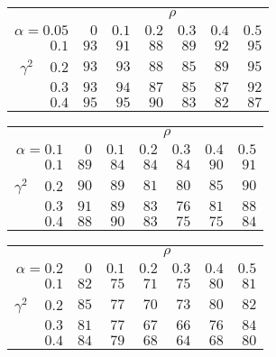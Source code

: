 \begin{tabular}{r|rrrrrr}
\hline\hline
 &\multicolumn{6}{c}{$\rho$} \\ 
 $\alpha = 0.05$ & $0$ & $0.1$ & $0.2$ & $0.3$ & $0.4$ & $0.5$ \\ 
 \hline$0.1$ & $93$ & $91$ & $88$ & $89$ & $92$ & $95$\\ 
$\gamma^2\;\;\;$ $0.2$ & $93$ & $93$ & $88$ & $85$ & $89$ & $95$\\ 
$0.3$ & $93$ & $94$ & $87$ & $85$ & $87$ & $92$\\ 
$0.4$ & $95$ & $95$ & $90$ & $83$ & $82$ & $87$\\ 
 \hline 
 \end{tabular}
 
 \vspace{2em} 
 
\begin{tabular}{r|rrrrrr}
\hline\hline
 &\multicolumn{6}{c}{$\rho$} \\ 
 $\alpha = 0.1$ & $0$ & $0.1$ & $0.2$ & $0.3$ & $0.4$ & $0.5$ \\ 
 \hline$0.1$ & $89$ & $84$ & $84$ & $84$ & $90$ & $91$\\ 
$\gamma^2\;\;\;$ $0.2$ & $90$ & $89$ & $81$ & $80$ & $85$ & $90$\\ 
$0.3$ & $91$ & $89$ & $83$ & $76$ & $81$ & $88$\\ 
$0.4$ & $88$ & $90$ & $83$ & $75$ & $75$ & $84$\\ 
 \hline 
 \end{tabular}
 
 \vspace{2em} 
 
\begin{tabular}{r|rrrrrr}
\hline\hline
 &\multicolumn{6}{c}{$\rho$} \\ 
 $\alpha = 0.2$ & $0$ & $0.1$ & $0.2$ & $0.3$ & $0.4$ & $0.5$ \\ 
 \hline$0.1$ & $82$ & $75$ & $71$ & $75$ & $80$ & $81$\\ 
$\gamma^2\;\;\;$ $0.2$ & $85$ & $77$ & $70$ & $73$ & $80$ & $82$\\ 
$0.3$ & $81$ & $77$ & $67$ & $66$ & $76$ & $84$\\ 
$0.4$ & $84$ & $79$ & $68$ & $64$ & $68$ & $80$\\ 
 \hline 
 \end{tabular}